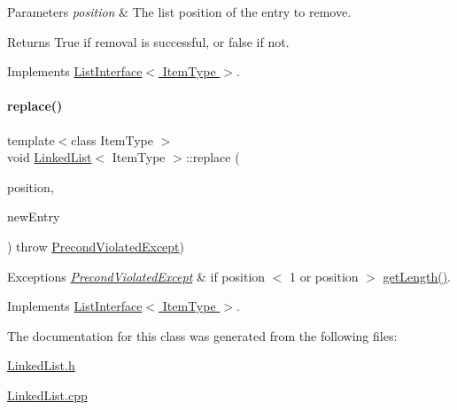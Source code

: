 \begin{DoxyParams}{Parameters}
{\em position} & The list position of the entry to remove. \\
\hline
\end{DoxyParams}
\begin{DoxyReturn}{Returns}
True if removal is successful, or false if not. 
\end{DoxyReturn}


Implements \hyperlink{class_list_interface_a5543002ec0d64bd2a63f3732f437af65}{List\+Interface$<$ Item\+Type $>$}.

\hypertarget{class_linked_list_a3035f880c50e7d8f68e67c093d4607ca}{}\label{class_linked_list_a3035f880c50e7d8f68e67c093d4607ca} 
\paragraph{\texorpdfstring{replace()}{replace()}}
{\footnotesize\ttfamily template$<$class Item\+Type $>$ \\
void \hyperlink{class_linked_list}{Linked\+List}$<$ Item\+Type $>$\+::replace (\begin{DoxyParamCaption}\item[{int}]{position,  }\item[{const Item\+Type \&}]{new\+Entry }\end{DoxyParamCaption}) throw  \hyperlink{class_precond_violated_except}{Precond\+Violated\+Except}) \hspace{0.3cm}{\ttfamily [virtual]}}


\begin{DoxyExceptions}{Exceptions}
{\em \hyperlink{class_precond_violated_except}{Precond\+Violated\+Except}} & if position $<$ 1 or position $>$ \hyperlink{class_linked_list_a61d045ef6008b494a1a516ecc992c0e7}{get\+Length()}. \\
\hline
\end{DoxyExceptions}


Implements \hyperlink{class_list_interface_aae877a56b7b9f5f526c37a00e234fad1}{List\+Interface$<$ Item\+Type $>$}.



The documentation for this class was generated from the following files\+:\begin{DoxyCompactItemize}
\item 
\hyperlink{_linked_list_8h}{Linked\+List.\+h}\item 
\hyperlink{_linked_list_8cpp}{Linked\+List.\+cpp}\end{DoxyCompactItemize}
